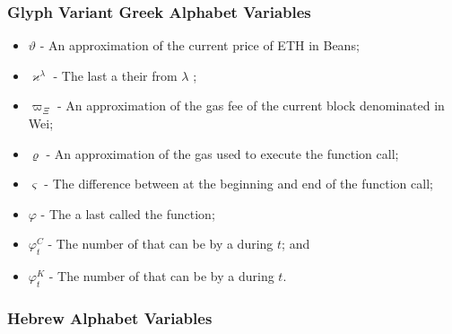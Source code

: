 \documentclass[class=article, crop=false]{standalone}
\begin{document}
\subsubsection{Glyph Variant Greek Alphabet Variables}

\begin{itemize}[topsep=0pt, itemsep=3pt,leftmargin=16pt]
    \item[] $\vartheta$ - An approximation of the current price of ETH in Beans;
    \item[] $\varkappa^{\lambda}$ - \hypertarget{ht122}{The last  a   their  from \hyperlink{ht126}{$\lambda$} };
    \item[] $\varpi_\Xi$ - An approximation of the gas fee of the current block denominated in Wei;
    \item[] $\varrho$ - An approximation of the gas used to execute the  function call;
    \item[] $\varsigma$ - The difference between  at the beginning and end of the  function call;
    \item[] $\varphi$ - \hypertarget{ht201}{The  a  last called the  function};
    \item[] ${\varphi}_t^C$ - \hypertarget{ht202}{The number of  that can be  by a  during $t$}; and
    \item[] ${\varphi}_t^K$ - \hypertarget{ht203}{The number of  that can be  by a  during $t$}.
\end{itemize}

\subsubsection{Hebrew Alphabet Variables}
\end{document}
